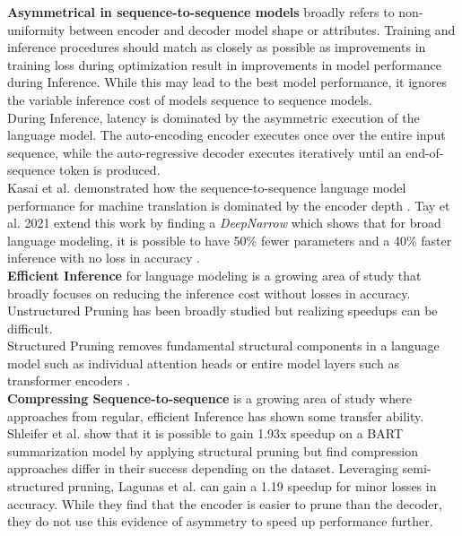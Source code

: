 \textbf{Asymmetrical in sequence-to-sequence models} broadly refers to non-uniformity between encoder and decoder model shape or attributes. Training and inference procedures should match as closely as possible \cite{Ranzato2015SequenceLT} \cite{Mihaylova2019ScheduledSF} as improvements in training loss during optimization result in improvements in model performance during Inference. While this may lead to the best model performance, it ignores the variable inference cost of models sequence to sequence models.  \\
During Inference, latency is dominated by the asymmetric execution of the language model. The auto-encoding encoder executes once over the entire input sequence, while the auto-regressive decoder executes iteratively until an end-of-sequence token is produced. \\
Kasai et al. demonstrated how the sequence-to-sequence language model performance for machine translation is dominated by the encoder depth \cite{Kasai2020DeepES}. Tay et al. 2021 extend this work by finding a \textit{DeepNarrow} which shows that for broad language modeling, it is possible to have 50\% fewer parameters and a 40\% faster inference with no loss in accuracy \cite{Tay2021ScaleEI}. \\
\textbf{Efficient Inference} for language modeling is a growing area of study that broadly focuses on reducing the inference cost without losses in accuracy. \\
Unstructured Pruning has been broadly studied \cite{Han2015ADN}  \cite{Sanh2020MovementPA} \cite{Kurti2022TheOB} \cite{Zafrir2021PruneOF} \cite{Campos2022SparseBERTSM} but realizing speedups can be difficult. \\ Structured Pruning removes fundamental structural components in a language model such as individual attention heads \cite{Voita2019AnalyzingMS} or entire model layers such as transformer encoders \cite{sanh2019distilbert}. \\
\textbf{Compressing Sequence-to-sequence} is a growing area of study where approaches from regular, efficient Inference has shown some transfer ability. Shleifer et al. show that it is possible to gain 1.93x speedup on a BART summarization model by applying structural pruning \cite{Shleifer2020PretrainedSD} but find compression approaches differ in their success depending on the dataset. Leveraging semi-structured pruning, Lagunas et al. can gain a 1.19 speedup \cite{Lagunas2021BlockPF} for minor losses in accuracy. While they find that the encoder is easier to prune than the decoder, they do not use this evidence of asymmetry to speed up performance further. \\
